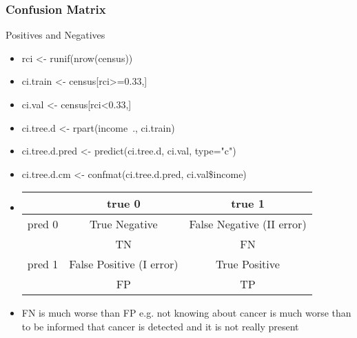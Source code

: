 \documentclass[smaller, proffesionalfonts]{beamer}
\begin{document}
\begin{frame}
\small
\frametitle{Confusion Matrix}
\begin{block}{Positives and Negatives}
\begin{itemize}
\item[\ ] 
rci <- runif(nrow(census))
\item[\ ] 
ci.train <- census[rci>=0.33,]
\item[\ ] 
ci.val <- census[rci<0.33,]
\item[\ ] 
ci.tree.d <- rpart(income~., ci.train)
\item[\ ] 
ci.tree.d.pred <- predict(ci.tree.d, ci.val, type="c")
\item[\ ] 
ci.tree.d.cm <- confmat(ci.tree.d.pred, ci.val\$income)
\item[\ ] 
\begin{center}
{\sf
   \begin{tabular}{|c||c|c|}
   \hline 
    & true 0 & true 1 \\
   \hline
   \hline
    pred 0 & True Negative & False Negative (II error) \\
     & TN & FN \\
   \hline
    pred 1 & False Positive (I error) & True Positive \\
    & FP & TP \\
   \hline
   \end{tabular}
}
\end{center}
\item[\ ] FN is much worse than FP e.g. not knowing about cancer is much worse than to be informed that cancer is detected and it is not really present
\end{itemize}
\end{block}
\end{frame}
\end{document}

